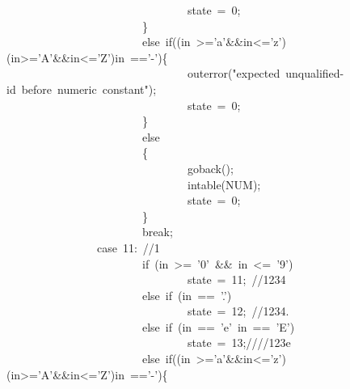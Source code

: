 \documentclass{article}
\begin{document}
\begin{mdpre}
~~~~~~~~~~~~~~~~~~~~~~~~~~~~~~~~state~=~{0};\\
~~~~~~~~~~~~~~~~~~~~~~~~\}~~~\\
~~~~~~~~~~~~~~~~~~~~~~~~{else}~{if}((in~\textgreater{}={'a'}\&\&in\textless{}={'z'})\textbar{}\textbar{}(in\textgreater{}={'A'}\&\&in\textless{}={'Z'})\textbar{}\textbar{}in~=={'-'})\{\\
~~~~~~~~~~~~~~~~~~~~~~~~~~~~~~~~outerror({"}{expected~unqualified-id~before~numeric~constant}{"});\\
~~~~~~~~~~~~~~~~~~~~~~~~~~~~~~~~state~=~{0};\\
~~~~~~~~~~~~~~~~~~~~~~~~\}\\
~~~~~~~~~~~~~~~~~~~~~~~~{else}\\
~~~~~~~~~~~~~~~~~~~~~~~~\{\\
~~~~~~~~~~~~~~~~~~~~~~~~~~~~~~~~goback();\\
~~~~~~~~~~~~~~~~~~~~~~~~~~~~~~~~intable({NUM});\\
~~~~~~~~~~~~~~~~~~~~~~~~~~~~~~~~state~=~{0};\\
~~~~~~~~~~~~~~~~~~~~~~~~\}\\
~~~~~~~~~~~~~~~~~~~~~~~~{break};\\
~~~~~~~~~~~~~~~~{case}~{11}:~{//1}\\
~~~~~~~~~~~~~~~~~~~~~~~~{if}~(in~\textgreater{}=~{'0'}~\&\&~in~\textless{}=~{'9'})\\
~~~~~~~~~~~~~~~~~~~~~~~~~~~~~~~~state~=~{11};~{//1234}\\
~~~~~~~~~~~~~~~~~~~~~~~~{else}~{if}~(in~==~{'.'})\\
~~~~~~~~~~~~~~~~~~~~~~~~~~~~~~~~state~=~{12};~{//1234.}\\
~~~~~~~~~~~~~~~~~~~~~~~~{else}~{if}~(in~==~{'e'}\textbar{}\textbar{}~in~==~{'E'})\\
~~~~~~~~~~~~~~~~~~~~~~~~~~~~~~~~state~=~{13};{////123e}\\
~~~~~~~~~~~~~~~~~~~~~~~~{else}~{if}((in~\textgreater{}={'a'}\&\&in\textless{}={'z'})\textbar{}\textbar{}(in\textgreater{}={'A'}\&\&in\textless{}={'Z'})\textbar{}\textbar{}in~=={'-'})\{\\

\end{mdpre}
\end{document}
